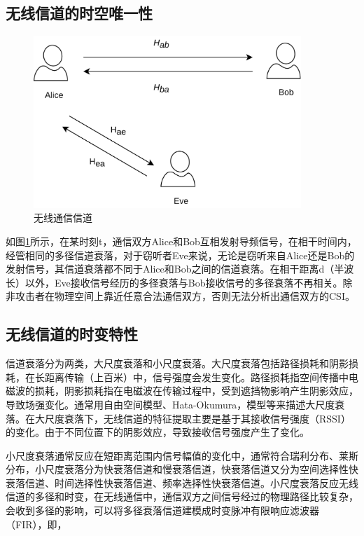 \documentclass[master]{seuthesis} %
\begin{document}
\begin{Main}
\subsection{无线信道的时空唯一性}

\begin{figure}[htbp!]
    \centering \includegraphics[width=0.9\textwidth]{images/channel} 
    \caption{无线通信信道}
    \label{wireless-channel}
\end{figure}

如图\ref{wireless-channel}所示，在某时刻t，通信双方Alice和Bob互相发射导频信号，在相干时间内，经管相同的多径信道衰落，对于窃听者Eve来说，无论是窃听来自Alice还是Bob的发射信号，其信道衰落都不同于Alice和Bob之间的信道衰落。在相干距离d（半波长）以外，Eve接收信号经历的多径衰落与Bob接收信号的多径衰落不再相关。除非攻击者在物理空间上靠近任意合法通信双方，否则无法分析出通信双方的CSI\cite{sasaoka2009secret}。

\subsection{无线信道的时变特性}


信道衰落分为两类，大尺度衰落和小尺度衰落。大尺度衰落包括路径损耗和阴影损耗，在长距离传输（上百米）中，信号强度会发生变化。路径损耗指空间传播中电磁波的损耗，阴影损耗指在电磁波在传输过程中，受到遮挡物影响产生阴影效应，导致场强变化。通常用自由空间模型、Hata-Okumura，模型等来描述大尺度衰落。在大尺度衰落下，无线信道的特征提取主要是基于其接收信号强度（RSSI）的变化。由于不同位置下的阴影效应，导致接收信号强度产生了变化。

小尺度衰落通常反应在短距离范围内信号幅值的变化中，通常符合瑞利分布、莱斯分布，小尺度衰落分为快衰落信道和慢衰落信道，快衰落信道又分为空间选择性快衰落信道、时间选择性快衰落信道、频率选择性快衰落信道。小尺度衰落反应无线信道的多径和时变，在无线通信中，通信双方之间信号经过的物理路径比较复杂，会收到多径的影响，可以将多径衰落信道建模成时变脉冲有限响应滤波器（FIR）\cite{liu2012exploiting}，即，


\end{Main}
\end{document}
